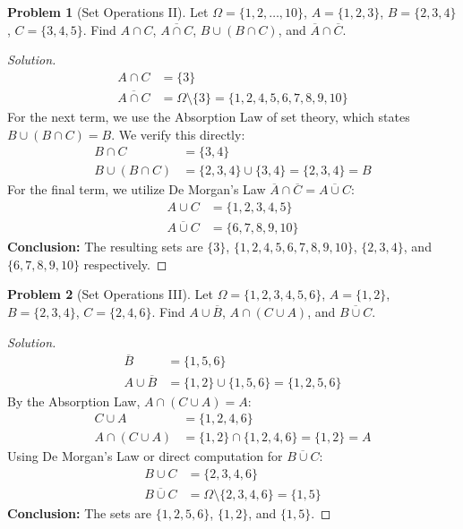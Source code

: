 \documentclass[11pt, letterpaper]{article}
\theoremstyle{definition}
\newtheorem{example}{Problem}
\theoremstyle{remark}
\newcommand{\comp}[1]{\overline{#1}}
\begin{document}
\begin{example}[Set Operations II]
    Let $\Omega = \{1, 2, \dots, 10\}$, $A = \{1, 2, 3\}$, $B = \{2, 3, 4\}$, $C = \{3, 4, 5\}$. Find $A \cap C$, $\overline{A \cap C}$, $B \cup (B \cap C)$, and $\comp{A} \cap \comp{C}$.
\end{example}
\begin{proof}[Solution]
    \begin{align*}
        A \cap C &= \{3\} \\
        \overline{A \cap C} &= \Omega \setminus \{3\} = \{1, 2, 4, 5, 6, 7, 8, 9, 10\}
    \end{align*}
    For the next term, we use the Absorption Law of set theory, which states $B \cup (B \cap C) = B$. We verify this directly:
    \begin{align*}
        B \cap C &= \{3, 4\} \\
        B \cup (B \cap C) &= \{2, 3, 4\} \cup \{3, 4\} = \{2, 3, 4\} = B
    \end{align*}
    For the final term, we utilize De Morgan's Law $\comp{A} \cap \comp{C} = \overline{A \cup C}$:
    \begin{align*}
        A \cup C &= \{1, 2, 3, 4, 5\} \\
        \overline{A \cup C} &= \{6, 7, 8, 9, 10\}
    \end{align*}
    \textbf{Conclusion:} The resulting sets are $\{3\}$, $\{1, 2, 4, 5, 6, 7, 8, 9, 10\}$, $\{2, 3, 4\}$, and $\{6, 7, 8, 9, 10\}$ respectively.
\end{proof}

\begin{example}[Set Operations III]
    Let $\Omega = \{1, 2, 3, 4, 5, 6\}$, $A = \{1, 2\}$, $B = \{2, 3, 4\}$, $C = \{2, 4, 6\}$. Find $A \cup \comp{B}$, $A \cap (C \cup A)$, and $\overline{B \cup C}$.
\end{example}
\begin{proof}[Solution]
    \begin{align*}
        \comp{B} &= \{1, 5, 6\} \\
        A \cup \comp{B} &= \{1, 2\} \cup \{1, 5, 6\} = \{1, 2, 5, 6\}
    \end{align*}
    By the Absorption Law, $A \cap (C \cup A) = A$:
    \begin{align*}
        C \cup A &= \{1, 2, 4, 6\} \\
        A \cap (C \cup A) &= \{1, 2\} \cap \{1, 2, 4, 6\} = \{1, 2\} = A
    \end{align*}
    Using De Morgan's Law or direct computation for $\overline{B \cup C}$:
    \begin{align*}
        B \cup C &= \{2, 3, 4, 6\} \\
        \overline{B \cup C} &= \Omega \setminus \{2, 3, 4, 6\} = \{1, 5\}
    \end{align*}
    \textbf{Conclusion:} The sets are $\{1, 2, 5, 6\}$, $\{1, 2\}$, and $\{1, 5\}$.
\end{proof}
\end{document}
